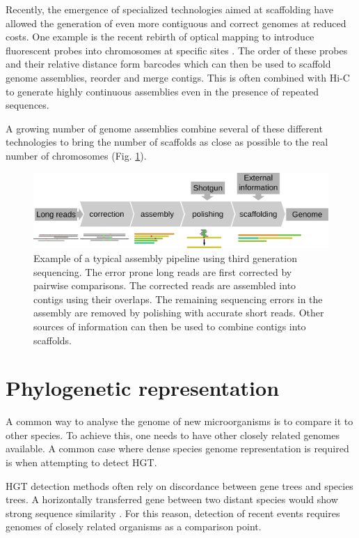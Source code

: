 Recently, the emergence of specialized technologies aimed at scaffolding have allowed the generation of even more contiguous and correct genomes at reduced costs. One example is the recent rebirth of optical mapping to introduce fluorescent probes into chromosomes at specific sites \cite{lamGenomeMappingNanochannel2012}. The order of these probes and their relative distance form barcodes which can then be used to scaffold genome assemblies, reorder and merge contigs. This is often combined with Hi-C to generate highly continuous assemblies even in the presence of repeated sequences.

A growing number of genome assemblies combine several of these different technologies to bring the number of scaffolds as close as possible to the real number of chromosomes (Fig. \ref{fig:01-03:assembly}).

\begin{figure}[htb]
    \includegraphics[width=\textwidth]{Parts/Part01/gfx/assembly_pipeline.pdf}
    \caption[Example of a third generation sequencing assembly pipeline.]{Example of a typical assembly pipeline using third generation sequencing. The error prone long reads are first corrected by pairwise comparisons. The corrected reads are assembled into contigs using their overlaps. The remaining sequencing errors in the assembly are removed by polishing with accurate short reads. Other sources of information can then be used to combine contigs into scaffolds.}
    \label{fig:01-03:assembly}
\end{figure}

\section{Phylogenetic representation}

A common way to analyse the genome of new microorganisms is to compare it to other species. To achieve this, one needs to have other closely related genomes available. A common case where dense species genome representation is required is when attempting to detect \acrshort{HGT}.

\acrshort{HGT} detection methods often rely on discordance between gene trees and species trees. A horizontally transferred gene between two distant species would show strong sequence similarity \cite{ravenhallInferringHorizontalGene2015}. For this reason, detection of recent events requires genomes of closely related organisms as a comparison point.

